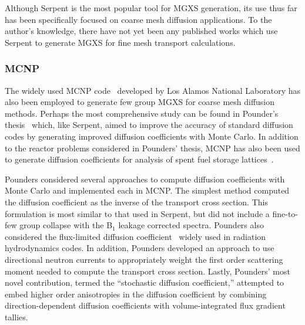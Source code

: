 Although Serpent is the most popular tool for \ac{MGXS} generation, its use thus far has been specifically focused on coarse mesh diffusion applications. To the author's knowledge, there have not yet been any published works which use Serpent to generate \ac{MGXS} for fine mesh transport calculations.


\subsubsection{MCNP}
\label{subsec:chap3-lit-review-diffusion-mcnp}

The widely used MCNP code~\cite{mcnpx2003manual} developed by Los Alamos National Laboratory has also been employed to generate few group \ac{MGXS} for coarse mesh diffusion methods. Perhaps the most comprehensive study can be found in Pounder's thesis~\cite{pounders2006stochastically} which, like Serpent, aimed to improve the accuracy of standard diffusion codes by generating improved diffusion coefficients with Monte Carlo. In addition to the reactor problems considered in Pounders' thesis, MCNP has also been used to generate diffusion coefficients for analysis of spent fuel storage lattices~\cite{ilas2003monte}.

Pounders considered several approaches to compute diffusion coefficients with Monte Carlo and implemented each in MCNP. The simplest method computed the diffusion coefficient as the inverse of the transport cross section. This formulation is most similar to that used in Serpent, but did not include a fine-to-few group collapse with the B$_{1}$ leakage corrected spectra. Pounders also considered the flux-limited diffusion coefficient~\cite{pomraning1984flux} widely used in radiation hydrodynamics codes. In addition, Pounders developed an approach to use directional neutron currents to appropriately weight the first order scattering moment needed to compute the transport cross section. Lastly, Pounders' most novel contribution, termed the ``stochastic diffusion coefficient,'' attempted to embed higher order anisotropies in the diffusion coefficient by combining direction-dependent diffusion coefficients with volume-integrated flux gradient tallies.

